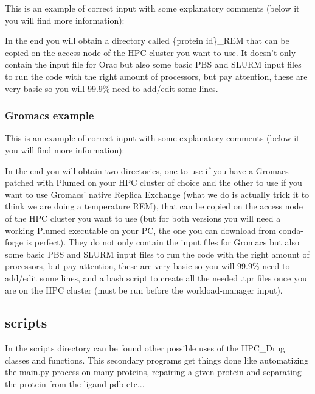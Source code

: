 					This is an example of correct input with some explanatory comments (below it you will find more information):
					
					

					In the end you will obtain a directory called \{protein id\}\_REM that can be copied on the access node of the HPC cluster you want to use. It doesn't only contain the input file for Orac\cite{orac} but also some basic PBS and SLURM input files to run the code with the right amount of processors, but pay attention, these are very basic so you will 99.9\% need to add/edit some lines.
								
				\subsubsection*{Gromacs example}
				
					This is an example of correct input with some explanatory comments (below it you will find more information):
				
					
				
					In the end you will obtain two directories, one to use if you have a Gromacs\cite{gromacs_ABRAHAM201519} patched with Plumed\cite{plumed} on your HPC cluster of choice and the other to use if you want to use Gromacs' native Replica Exchange (what we do is actually trick it to think we are doing a temperature REM), that can be copied on the access node of the HPC cluster you want to use (but for both versions you will need a working Plumed executable on your PC, the one you can download from conda-forge is perfect). They do not only contain the input files for Gromacs but also some basic PBS and SLURM input files to run the code with the right amount of processors, but pay attention, these are very basic so you will 99.9\% need to add/edit some lines, and a bash script to create all the needed .tpr files once you are on the HPC cluster (must be run before the workload-manager input).
				
	\subsection{scripts}
	
		In the scripts directory can be found other possible uses of the HPC\_Drug classes and functions. This secondary programs get things done like automatizing the main.py process on many proteins, repairing a given protein and separating the protein from the ligand pdb etc...
		
